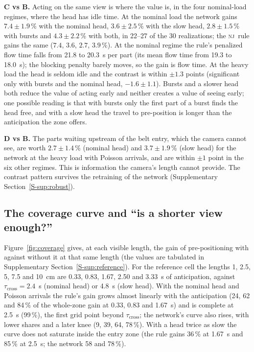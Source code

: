 \documentclass[11pt,a4paper]{article}
\newcommand{\nj}{\textsc{nj}}
\newcommand{\tcross}{\tau_{\mathrm{cross}}}
\newcommand{\supsec}[1]{Supplementary Section~\ref{S-#1}}
\begin{document}
\textbf{C vs B.} Acting on the same view is where the value is, in the four nominal-load
regimes, where the head has idle time. At the nominal load the network gains
$7.4\pm1.9$\,\% with the nominal head, $3.6\pm2.5$\,\% with the slow head, $2.8\pm1.5$\,\%
with bursts and $4.3\pm2.2$\,\% with both, in 22--27 of the 30 realizations; the \nj\ rule
gains the same ($7.4$, $3.6$, $2.7$, $3.9$\,\%). At the nominal regime the rule's
penalized flow time falls from 21.8 to 20.3~s per part (its mean flow time from 19.3 to
18.0~s); the blocking penalty barely moves, so the gain is flow time. At the heavy load the
head is seldom idle and the contrast is within $\pm1.3$ points (significant only with
bursts and the nominal head, $-1.6\pm1.1$). Bursts and a slower head both reduce the value
of acting early and neither creates a value of seeing early; one possible reading is that
with bursts only the first part of a burst finds the head free, and with a slow head the
travel to pre-position is longer than the anticipation the zone offers.

\textbf{D vs B.} The parts waiting upstream of the belt entry, which the camera cannot see,
are worth $2.7\pm1.4$\,\% (nominal head) and $3.7\pm1.9$\,\% (slow head) for the network at
the heavy load with Poisson arrivals, and are within $\pm1$ point in the six other regimes.
This is information the camera's length cannot provide. The contrast pattern survives the
retraining of the network (\supsec{sup:robust}).

\subsection{The coverage curve and ``is a shorter view enough?''}\label{sec:coverage}
Figure~\ref{fig:coverage} gives, at each visible length, the gain of pre-positioning with
against without it at that same length (the values are tabulated in
\supsec{sup:reference}). For the reference cell the lengths 1, 2.5, 5, 7.5 and 10~cm are
0.33, 0.83, 1.67, 2.50 and 3.33~s of anticipation, against $\tcross=2.4$~s (nominal head)
or 4.8~s (slow head). With the nominal head and Poisson arrivals the rule's gain grows
almost linearly with the anticipation (24, 62 and 84\,\% of the whole-zone gain at 0.33,
0.83 and 1.67~s) and is complete at 2.5~s (99\,\%), the first grid point beyond $\tcross$;
the network's curve also rises, with lower shares and a later knee (9, 39, 64,
78\,\%). With a head twice as slow the curve does not saturate inside the entry zone (the
rule gains 36\,\% at 1.67~s and 85\,\% at 2.5~s; the network 58 and 78\,\%).
\end{document}
